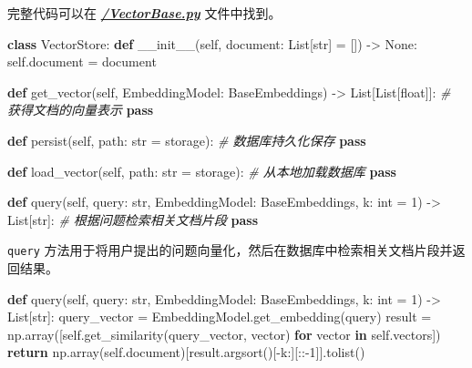 \documentclass[
]{article}
\newenvironment{Shaded}{}{}
\newcommand{\BuiltInTok}[1]{\textcolor[rgb]{0.00,0.50,0.00}{#1}}
\newcommand{\CommentTok}[1]{\textcolor[rgb]{0.38,0.63,0.69}{\textit{#1}}}
\newcommand{\ControlFlowTok}[1]{\textcolor[rgb]{0.00,0.44,0.13}{\textbf{#1}}}
\newcommand{\DecValTok}[1]{\textcolor[rgb]{0.25,0.63,0.44}{#1}}
\newcommand{\FunctionTok}[1]{\textcolor[rgb]{0.02,0.16,0.49}{#1}}
\newcommand{\KeywordTok}[1]{\textcolor[rgb]{0.00,0.44,0.13}{\textbf{#1}}}
\newcommand{\NormalTok}[1]{#1}
\newcommand{\OperatorTok}[1]{\textcolor[rgb]{0.40,0.40,0.40}{#1}}
\newcommand{\StringTok}[1]{\textcolor[rgb]{0.25,0.44,0.63}{#1}}
\newcommand{\VariableTok}[1]{\textcolor[rgb]{0.10,0.09,0.49}{#1}}
\begin{document}
完整代码可以在
\textbf{\emph{\href{./RAG/VectorBase.py}{/VectorBase.py}}} 文件中找到。

\begin{Shaded}
\begin{Highlighting}[]
\KeywordTok{class}\NormalTok{ VectorStore:}
    \KeywordTok{def} \FunctionTok{\_\_init\_\_}\NormalTok{(}\VariableTok{self}\NormalTok{, document: List[}\BuiltInTok{str}\NormalTok{] }\OperatorTok{=}\NormalTok{ [}\StringTok{\textquotesingle{}\textquotesingle{}}\NormalTok{]) }\OperatorTok{{-}\textgreater{}} \VariableTok{None}\NormalTok{:}
        \VariableTok{self}\NormalTok{.document }\OperatorTok{=}\NormalTok{ document}

    \KeywordTok{def}\NormalTok{ get\_vector(}\VariableTok{self}\NormalTok{, EmbeddingModel: BaseEmbeddings) }\OperatorTok{{-}\textgreater{}}\NormalTok{ List[List[}\BuiltInTok{float}\NormalTok{]]:}
        \CommentTok{\# 获得文档的向量表示}
        \ControlFlowTok{pass}

    \KeywordTok{def}\NormalTok{ persist(}\VariableTok{self}\NormalTok{, path: }\BuiltInTok{str} \OperatorTok{=} \StringTok{\textquotesingle{}storage\textquotesingle{}}\NormalTok{):}
        \CommentTok{\# 数据库持久化保存}
        \ControlFlowTok{pass}

    \KeywordTok{def}\NormalTok{ load\_vector(}\VariableTok{self}\NormalTok{, path: }\BuiltInTok{str} \OperatorTok{=} \StringTok{\textquotesingle{}storage\textquotesingle{}}\NormalTok{):}
        \CommentTok{\# 从本地加载数据库}
        \ControlFlowTok{pass}

    \KeywordTok{def}\NormalTok{ query(}\VariableTok{self}\NormalTok{, query: }\BuiltInTok{str}\NormalTok{, EmbeddingModel: BaseEmbeddings, k: }\BuiltInTok{int} \OperatorTok{=} \DecValTok{1}\NormalTok{) }\OperatorTok{{-}\textgreater{}}\NormalTok{ List[}\BuiltInTok{str}\NormalTok{]:}
        \CommentTok{\# 根据问题检索相关文档片段}
        \ControlFlowTok{pass}
\end{Highlighting}
\end{Shaded}

\texttt{query}
方法用于将用户提出的问题向量化，然后在数据库中检索相关文档片段并返回结果。

\begin{Shaded}
\begin{Highlighting}[]
\KeywordTok{def}\NormalTok{ query(}\VariableTok{self}\NormalTok{, query: }\BuiltInTok{str}\NormalTok{, EmbeddingModel: BaseEmbeddings, k: }\BuiltInTok{int} \OperatorTok{=} \DecValTok{1}\NormalTok{) }\OperatorTok{{-}\textgreater{}}\NormalTok{ List[}\BuiltInTok{str}\NormalTok{]:}
\NormalTok{    query\_vector }\OperatorTok{=}\NormalTok{ EmbeddingModel.get\_embedding(query)}
\NormalTok{    result }\OperatorTok{=}\NormalTok{ np.array([}\VariableTok{self}\NormalTok{.get\_similarity(query\_vector, vector) }\ControlFlowTok{for}\NormalTok{ vector }\KeywordTok{in} \VariableTok{self}\NormalTok{.vectors])}
    \ControlFlowTok{return}\NormalTok{ np.array(}\VariableTok{self}\NormalTok{.document)[result.argsort()[}\OperatorTok{{-}}\NormalTok{k:][::}\OperatorTok{{-}}\DecValTok{1}\NormalTok{]].tolist()}
\end{Highlighting}
\end{Shaded}
\end{document}
